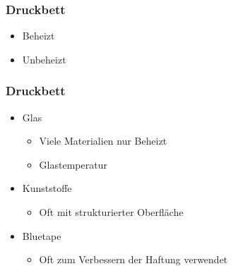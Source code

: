 {
\begin{frame}
  \frametitle{Druckbett}
  \pause
  \begin{itemize}
    \item Beheizt \pause
    \item Unbeheizt
  \end{itemize}
\end{frame}

\begin{frame}
  \frametitle{Druckbett}
  \begin{itemize}
    \item Glas \pause
    \begin{itemize}
      \item Viele Materialien nur Beheizt
      \item Glastemperatur \pause
    \end{itemize}
    \item Kunststoffe \pause
    \begin{itemize}
      \item Oft mit strukturierter Oberfläche \pause
    \end{itemize}
    \item Bluetape \pause
    \begin{itemize}
      \item Oft zum Verbessern der Haftung verwendet
    \end{itemize}
  \end{itemize}
\end{frame}
}
